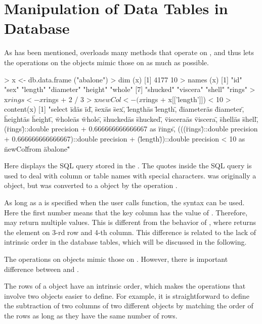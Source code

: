 \section{Manipulation of Data Tables in Database}

As has been mentioned,  overloads many methods that
operate on , and thus lets the operations on the
 objects mimic those on  as much as
possible.

\begin{example}
> x <- db.data.frame ("abalone")
> dim (x)
[1] 4177   10
> names (x)
 [1] "id"       "sex"      "length"   "diameter" "height"   "whole"
 [7] "shucked"  "viscera"  "shell"    "rings"
> x$rings <- x$rings + 2 / 3
> x$newCol <- (x$rings + x[['length']]) < 10
> content(x)
[1] "select \"id\" as \"id\", \"sex\" as \"sex\", \"length\" as \"length\",
\"diameter\" as \"diameter\", \"height\" as \"height\", \"whole\" as \"whole\",
\"shucked\" as \"shucked\", \"viscera\" as \"viscera\", \"shell\" as \"shell\",
(\"rings\")::double precision + 0.666666666666667 as \"rings\",
(((\"rings\")::double precision + 0.666666666666667)::double precision
+ (\"length\"))::double precision < 10 as \"newCol\" from \"abalone\""
\end{example}
Here  displays the SQL query stored in the
. The quotes inside the SQL query is used to deal
with column or table names with special characters.  was
originally a  object, but was converted to a
 object by the operation .

As long as a  is specified when the user calls
 function, the syntax  can be used.
Here the first number  means that the key column has the
value of . Therefore,  may return multiple
values. This is different from the behavior of ,
where  returns the element on 3-rd row and 4-th column.
This difference is related to the lack of intrinsic order in the
database tables, which will be discussed in the following.

The operations on  objects mimic those on
. However, there is important difference between
 and .

The rows of a  object have an intrinsic order,
which makes the operations that involve two 
objects easier to define. For example, it is straightforward to define
the subtraction of two columns of two different 
objects by matching the order of the rows as long as they have the
same number of rows.


